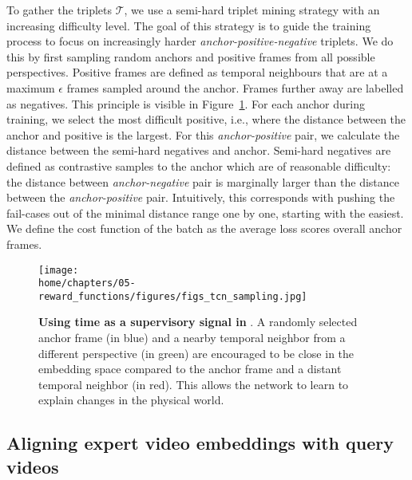 \documentclass[\home/main.tex]{subfiles}
\begin{document}
To gather the triplets $\mathcal{T}$, we use a semi-hard triplet mining strategy with an increasing difficulty level. The goal of this strategy is to guide the training process to focus on increasingly harder \textit{anchor-positive-negative} triplets. We do this by first sampling random anchors and positive frames from all possible perspectives. Positive frames are defined as temporal neighbours that are at a maximum $\epsilon$ frames sampled around the anchor. Frames further away are labelled as negatives. This principle is visible in Figure~\ref{fig:triplet_mining}. For each anchor during training, we select the most difficult positive, i.e., where the distance between the anchor and positive is the largest. For this \textit{anchor-positive} pair, we calculate the distance between the semi-hard negatives and anchor. Semi-hard negatives are defined as contrastive samples to the anchor which are of reasonable difficulty: the distance between \textit{anchor-negative} pair is marginally larger than the distance between the \textit{anchor-positive} pair. Intuitively, this corresponds with pushing the fail-cases out of the minimal distance range one by one, starting with the easiest. We define the cost function of the batch as the average loss scores overall anchor frames.

\begin{figure}[htbp]
    \centering
    \texttt{[image: \\home/chapters/05-reward\_functions/figures/figs\_tcn\_sampling.jpg]}
    \caption{\textbf{Using time as a supervisory signal in }. A randomly selected anchor frame (in blue) and a nearby temporal neighbor from a different perspective (in green) are encouraged to be close in the embedding space compared to the anchor frame and a distant temporal neighbor (in red). This allows the network to learn to explain changes in the physical world.}
    \label{fig:triplet_mining}
\end{figure}

\subsection{Aligning expert video embeddings with query videos} \label{subsec:dtw}

\end{document}
